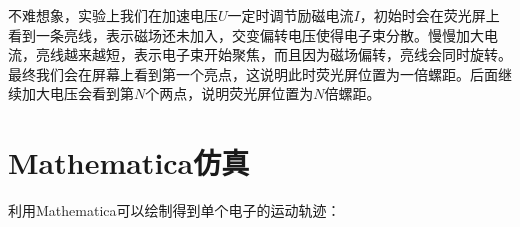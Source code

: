 \documentclass{WHUReport}
\begin{document}
\begin{multicols}{2}
	 不难想象，实验上我们在加速电压$U$一定时调节励磁电流$I$，初始时会在荧光屏上看到一条亮线，表示磁场还未加入，交变偏转电压使得电子束分散。慢慢加大电流，亮线越来越短，表示电子束开始聚焦，而且因为磁场偏转，亮线会同时旋转。最终我们会在屏幕上看到第一个亮点，这说明此时荧光屏位置为一倍螺距。后面继续加大电压会看到第$N$个两点，说明荧光屏位置为$N$倍螺距。
	\section{Mathematica仿真}
	利用Mathematica可以绘制得到单个电子的运动轨迹：
	\begin{figure}[H]
		\centering

\end{figure}
\end{multicols}
\end{document}
